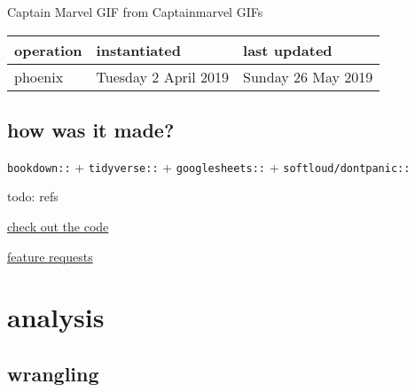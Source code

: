 \documentclass[]{book}
\newenvironment{Shaded}{\begin{snugshade}}{\end{snugshade}}
\newcommand{\CommentTok}[1]{\textcolor[rgb]{0.56,0.35,0.01}{\textit{#1}}}
\newcommand{\DataTypeTok}[1]{\textcolor[rgb]{0.13,0.29,0.53}{#1}}
\newcommand{\KeywordTok}[1]{\textcolor[rgb]{0.13,0.29,0.53}{\textbf{#1}}}
\newcommand{\NormalTok}[1]{#1}
\newcommand{\OperatorTok}[1]{\textcolor[rgb]{0.81,0.36,0.00}{\textbf{#1}}}
\newcommand{\StringTok}[1]{\textcolor[rgb]{0.31,0.60,0.02}{#1}}
\begin{document}
Captain Marvel GIF from Captainmarvel GIFs

\begin{longtable}[]{@{}lll@{}}
\toprule
operation & instantiated & last updated\tabularnewline
\midrule
\endhead
phoenix & Tuesday 2 April 2019 & Sunday 26 May 2019\tabularnewline
\bottomrule
\end{longtable}

\hypertarget{how-was-it-made}{%
\section{how was it made?}\label{how-was-it-made}}

\texttt{bookdown::} + \texttt{tidyverse::} + \texttt{googlesheets::} + \texttt{softloud/dontpanic::}

todo: refs

\href{https://github.com/softloud/lifeswork}{check out the code}

\href{https://github.com/softloud/lifeswork/issues}{feature requests}

\hypertarget{analysis}{%
\chapter{analysis}\label{analysis}}

\hypertarget{wrangling}{%
\section{wrangling}\label{wrangling}}

\begin{Shaded}
\end{Shaded}
\end{document}
